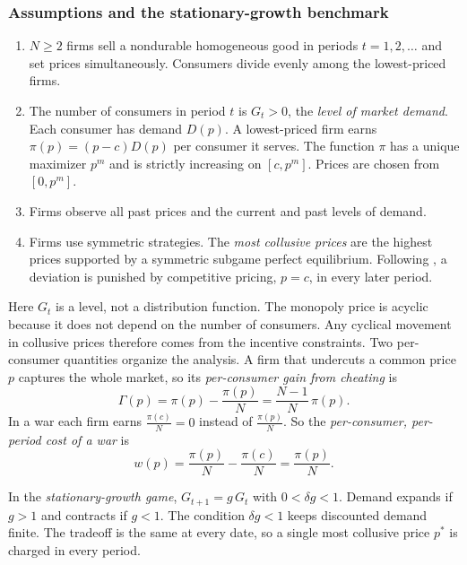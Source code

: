 \subsubsection{Assumptions and the stationary-growth benchmark}

\begin{assumption}\label{asm:12-bs}
\leavevmode
\begin{enumerate}[label=(\roman*)]
\item $N \ge 2$ firms sell a nondurable homogeneous good in periods $t = 1, 2, \dots$ and set prices
simultaneously. Consumers divide evenly among the lowest-priced firms.
\item The number of consumers in period $t$ is $G_t > 0$, the \emph{level of market demand}. Each consumer has demand
$D(p)$. A lowest-priced firm earns $\pi(p) = (p - c)D(p)$ per consumer it serves. The function $\pi$ has a unique
maximizer $p^m$ and is strictly increasing on $[c, p^m]$. Prices are chosen from $[0, p^m]$.
\item Firms observe all past prices and the current and past levels of demand.
\item Firms use symmetric strategies. The \emph{most collusive prices} are the highest prices supported by a symmetric
subgame perfect equilibrium. Following \citet{Abreu1986}, a deviation is punished by competitive pricing, $p = c$, in
every later period.
\end{enumerate}
\end{assumption}

Here $G_t$ is a level, not a distribution function. The monopoly price is acyclic because it does not depend on the
number of consumers. Any cyclical movement in collusive prices therefore comes from the incentive constraints. Two
per-consumer quantities organize the analysis. A firm that undercuts a common price $p$ captures the whole market, so
its \emph{per-consumer gain from cheating} is
\begin{equation}\label{eq:12-bs-gamma}
\Gamma(p) = \pi(p) - \frac{\pi(p)}{N} = \frac{N-1}{N}\,\pi(p).
\end{equation}
In a war each firm earns $\frac{\pi(c)}{N} = 0$ instead of $\frac{\pi(p)}{N}$. So the \emph{per-consumer, per-period cost of a war} is
\begin{equation}\label{eq:12-bs-w}
w(p) = \frac{\pi(p)}{N} - \frac{\pi(c)}{N} = \frac{\pi(p)}{N}.
\end{equation}

In the \emph{stationary-growth game}, $G_{t+1} = g\,G_t$ with $0 < \delta g < 1$. Demand expands if $g > 1$ and contracts if
$g < 1$. The condition $\delta g < 1$ keeps discounted demand finite. The tradeoff is the same at every date, so a single
most collusive price $p^*$ is charged in every period.

